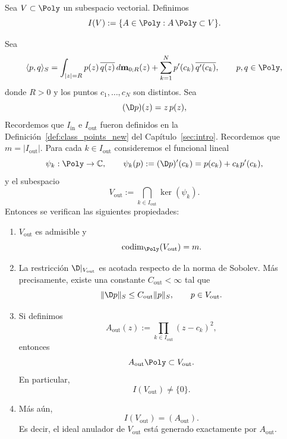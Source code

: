 \begin{defn}
	Sea $V\subset \Poly$ un subespacio vectorial. Definimos
	\[
		I(V):=\{A\in \Poly: A\,\Poly\subset V\}.
	\]
\end{defn}

\begin{thm}
	\label{thm:Vout_anulador}
	Sea
	\[
		\langle p,q\rangle_S
		=
		\int_{|z|=R} p(z)\,\overline{q(z)}\,d\mathbf{m}_{0;R}(z)
		+
		\sum_{k=1}^N p'(c_k)\,\overline{q'(c_k)},
		\qquad p,q\in \Poly,
	\]
	donde $R>0$ y los puntos $c_1,\dots,c_N$ son distintos. Sea
	\[
		(\D p)(z)=z\,p(z),
	\]
	Recordemos que $I_{\mathrm{in}}$ e $I_{\mathrm{out}}$ fueron definidos en la Definición~\ref{def:class_points_new} del Capítulo~\ref{sec:intro}.
	Recordemos que $m=|I_{\mathrm{out}}|$.
	Para cada $k\in I_{\mathrm{out}}$ consideremos el funcional lineal
	\[
		\psi_k:\Poly\to\mathbb C,
		\qquad
		\psi_k(p):=(\D p)'(c_k)=p(c_k)+c_kp'(c_k),
	\]
	y el subespacio
	\[
		V_{\mathrm{out}}:=\bigcap_{k\in I_{\mathrm{out}}}\ker(\psi_k).
	\]
	Entonces se verifican las siguientes propiedades:

	\begin{enumerate}
		\item $V_{\mathrm{out}}$ es admisible y
		      \[
			      \operatorname{codim}_{\Poly}(V_{\mathrm{out}})=m.
		      \]

		\item La restricción $\D|_{V_{\mathrm{out}}}$ es acotada respecto de la norma
		      de Sobolev. Más precisamente, existe una constante $C_{\mathrm{out}}<\infty$ tal que
		      \[
			      \|\D p\|_S\le C_{\mathrm{out}}\|p\|_S,
			      \qquad p\in V_{\mathrm{out}}.
		      \]

		\item Si definimos
		      \[
			      A_{\mathrm{out}}(z):=\prod_{k\in I_{\mathrm{out}}}(z-c_k)^2,
		      \]
		      entonces
		      \[
			      A_{\mathrm{out}}\Poly\subset V_{\mathrm{out}}.
		      \]
		      En particular,
		      \[
			      I(V_{\mathrm{out}})\neq \{0\}.
		      \]

		\item Más aún,
		      \[
			      I(V_{\mathrm{out}})=(A_{\mathrm{out}}).
		      \]
		      Es decir, el ideal anulador de $V_{\mathrm{out}}$ está generado exactamente por
		      $A_{\mathrm{out}}$.
	\end{enumerate}
\end{thm}


